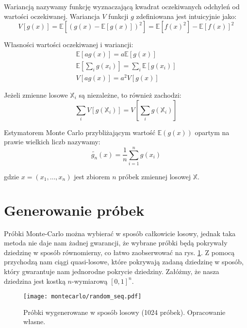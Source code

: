 \documentclass[../main.tex]{subfiles}
\begin{document}
Wariancją nazywamy funkcję wyznaczającą kwadrat oczekiwanych odchyleń od wartości oczekiwanej. Wariancja $V$ funkcji $g$ zdefiniowana jest intuicyjnie jako:
\begin{equation}
V\left[ g(x) \right] 
	=
	\mathbb{E}\left[ 
		\left( 
			g(x) - \mathbb{E}\left[ g(x) \right] 
		\right)^2 
	\right]
	=
	\mathbb{E}\left[
		f(x)^2
	\right] - \mathbb{E}\left[
		f(x)
	\right]^2
 \end{equation}

Własności wartości oczekiwanej i wariancji:
\begin{equation}
\begin{gathered}
\mathbb{E}\left[ag(x)\right] = a \mathbb{E} \left[g(x)\right] \\
\mathbb{E}\left[\sum_{i} g(x_i)\right] = \sum_{i} \mathbb{E} \left[g(x_i)\right] \\
V\left[ ag(x) \right] = a^2 V\left[g(x)\right]
\end{gathered}
\end{equation}

Jeżeli zmienne losowe $\mathbb{X}_i$ są niezależne, to również zachodzi:
\begin{equation}
\sum_{i} V \left[
	g(\mathbb{X}_i)
\right]
=
V \left[
	\sum_{i} g(\mathbb{X}_i)
\right]
\end{equation}

Estymatorem Monte Carlo przybliżającym wartość $\mathbb{E}(g(x))$ opartym na prawie wielkich liczb nazywamy:
\begin{equation}
\widetilde{g_n}(x) =
	\frac{1}{n}
	\sum_{i=1}^{n}g(x_i)
\end{equation}

\noindent gdzie $x=(x_1, \ldots, x_n)$ jest zbiorem $n$ próbek zmiennej losowej $\mathbb{X}$.

\section{Generowanie próbek}

Próbki Monte-Carlo można wybierać w sposób całkowicie losowy, jednak taka metoda nie daje nam żadnej gwarancji, że wybrane próbki będą pokrywały dziedzinę w sposób równomierny, co łatwo zaobserwować na rys. \ref{fig:RandomSamples}. Z pomocą przychodzą nam ciągi quasi-losowe, które pokrywają zadaną dziedzinę w sposób, który gwarantuje nam jednorodne pokrycie dziedziny. Załóżmy, że nasza dziedzina jest kostką $n$-wymiarową 
$[0,1]^{n}$.

\begin{figure}[h]
  \centering
  \texttt{[image: montecarlo/random\_seq.pdf]}
  \caption{Próbki wygenerowane w sposób losowy (1024 próbek). Opracowanie własne.}
  \label{fig:RandomSamples}
\end{figure}
\end{document}
